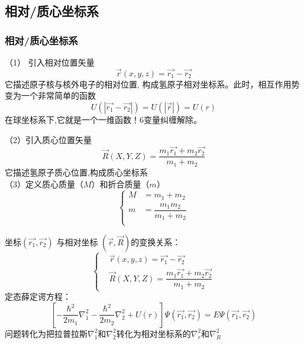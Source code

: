\subsection{相对/质心坐标系}
\begin{frame}
\frametitle{相对/质心坐标系}
（1） 引入相对位置矢量
\begin{equation} \label{eq:hydr-1}
\vec{r} (x,y,z)= \vec{r_1}-\vec{r_2}	
\end{equation}
它描述原子核与核外电子的相对位置, 构成氢原子相对坐标系。此时，相互作用势变为一个非常简单的函数 
$$U(| \vec{r_1}-\vec{r_2} | ) = U(|\vec{r}|) = U(r)$$
在球坐标系下,它就是一个一维函数！6变量纠缠解除。
\end{frame}		

\begin{frame}
（2）引入质心位置矢量
\begin{equation} \label{eq:hydr-2}
\vec{R} (X,Y,Z)= \dfrac{ m_1\vec{r_1}+ m_2\vec{r_2}  }{ m_1+m_2} 	
\end{equation}
它描述氢原子质心位置,构成质心坐标系\\
（3）定义质心质量（$M$）和折合质量（$m$）
\[ \left\{
\begin{aligned}
M &= m_1+m_2 \\
  m &= \dfrac{m_1m_2}{m_1+m_2} \\ 
\end{aligned}\right.
\]
\end{frame}		

\begin{frame}
坐标$ (\vec{r_1},\vec{r_2} )$ 与相对坐标 $ (\vec{r},\vec{R} )$的变换关系：
\begin{equation}\label{eq:trans} 
\left\{\begin{aligned}
      &\vec{r} (x,y,z)  = \vec{r_1}-\vec{r_2} \\
  &\vec{R} (X,Y,Z) = \dfrac{ m_1\vec{r_1}+ m_2\vec{r_2}  }{ m_1+m_2} 	
\end{aligned}\right.
\end{equation}
定态薛定谔方程：
\begin{equation}\label{eq:trans1}
\left[-\frac{\hbar^2}{2 m_1} \nabla_1 ^2  -\frac{\hbar^2}{2 m_2} \nabla_2 ^2   +U(r) \right] \Psi (\vec{r_1},\vec{r_2}) =E \Psi (\vec{r_1},\vec{r_2}) 
\end{equation}
问题转化为把拉普拉斯$\nabla_1 ^2$和$\nabla_2 ^2$转化为相对坐标系的$\nabla_r ^2$和$\nabla_R ^2$
\end{frame}		

